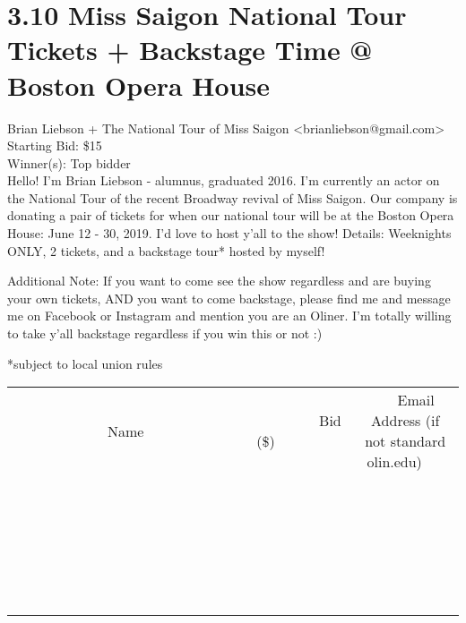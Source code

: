 \documentclass[11pt]{article}
\begin{document}
					\section*{3.10 Miss Saigon National Tour Tickets + Backstage Time @ Boston Opera House}
					Brian Liebson + The National Tour of Miss Saigon <brianliebson@gmail.com> \\
					Starting Bid: \$15 \\
					Winner(s): Top bidder \\
					Hello! I'm Brian Liebson - alumnus, graduated 2016. I'm currently an actor on the National Tour of the recent Broadway revival of Miss Saigon. Our company is donating a pair of tickets for when our national tour will be at the Boston Opera House: June 12 - 30, 2019. I'd love to host y'all to the show! Details: Weeknights ONLY, 2 tickets, and a backstage tour* hosted by myself! 



Additional Note: If you want to come see the show regardless and are buying your own tickets, AND you want to come backstage, please find me and message me on Facebook or Instagram and mention you are an Oliner. I'm totally willing to take y'all backstage regardless if you win this or not :) 

*subject to local union rules \\
					[6ex]
					\begin{tabular}{c c c}
						~~~~~~~~~~~~~Name~~~~~~~~~~~~~ & ~~~~~~~~~Bid (\$)~~~~~~~~~ & ~~~Email Address (if not standard olin.edu)~~~ \\
				
 & & \\
\hline
 & & \\
\hline
 & & \\
\hline
 & & \\
\hline
 & & \\
\hline
 & & \\
\hline
 & & \\
\hline
 & & \\
\hline
 & & \\
\hline
 & & \\
\hline
 & & \\
\hline
 & & \\
\hline
 & & \\
\hline
 & & \\
\hline
 & & \\
\hline
 & & \\
\hline
 & & \\
\hline
 & & \\
\hline
 & & \\
\hline
 & & \\
\hline
 & & \\
\hline
 & & \\
\hline
 & & \\
\hline
 & & \\
\hline
 & & \\
\hline
 & & \\
\hline
					\end{tabular}
					\clearpage
				
\end{document}
